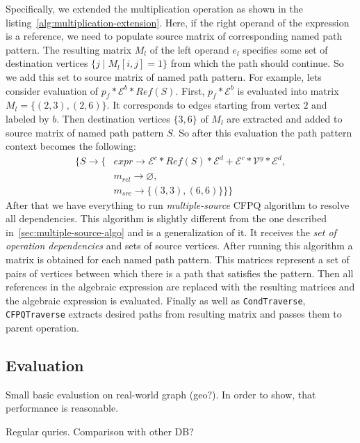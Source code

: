 Specifically, we extended the multiplication operation as shown in the listing~\autoref{alg:multiplication-extension}. Here, if the right operand of the expression is a reference, we need to populate source matrix of corresponding named path pattern. The resulting matrix $M_l$ of the left operand $e_l$ specifies some set of destination vertices $\{j \mid M_l[i,j] = 1\}$ from which the path should continue. So we add this set to source matrix of named path pattern. For example, lets consider evaluation of $p_f * \mathcal{E}^b * Ref(S)$. First, $p_f * \mathcal{E}^b$ is evaluated into matrix $M_l = \{(2, 3), (2, 6)\}$. It corresponds to edges starting from vertex $2$ and labeled by $b$. Then destination vertices $\{3, 6\}$ of $M_l$ are extracted and added to source matrix of named path pattern $S$. So after this evaluation the path pattern context becomes the following:
\begin{align*}
   \{ S  \xrightarrow{} \{ & expr \xrightarrow{} \mathcal{E}^c * Ref(S) * \mathcal{E}^d + \mathcal{E}^c * \mathcal{V}^y * \mathcal{E}^d, \\
                           & m_{rel} \xrightarrow{} \varnothing, \\
                           & m_{src} \xrightarrow{} \{(3, 3), (6, 6)\} \} \}
\end{align*}
After that we have everything to run \textit{multiple-source} CFPQ algorithm to resolve all dependencies. This algorithm is slightly different from the one described in~\autoref{sec:multiple-source-algo} and is a generalization of it. It receives the \textit{set of operation dependencies} and sets of source vertices. After running this algorithm a matrix is obtained for each named path pattern. This matrices represent a set of pairs of vertices between which there is a path that satisfies the pattern. Then all references in the algebraic expression are replaced with the resulting matrices and the algebraic expression is evaluated. Finally as well as \lstinline{CondTraverse}, \lstinline{CFPQTraverse} extracts desired paths from resulting matrix and passes them to parent operation.



\subsection{Evaluation}

Small basic evalustion on real-world graph (geo?).
In order to show, that performance is reasonable.

Regular quries. Comparison with other DB?

